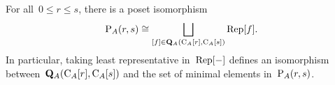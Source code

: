 \begin{prop}\label{prop:morphisms}
For all~$0\leqslant r\leqslant s$, there is a poset isomorphism~$$\mathrm{P}_A(r,s)\cong \bigsqcup_{[f]\in \mathbf{Q}_A(\mathrm{C}_A[r],\mathrm{C}_A[s])}\operatorname{Rep}[f].$$
In particular, taking least representative in~$\operatorname{Rep}[-]$ defines an isomorphism between~$\mathbf{Q}_A(\mathrm{C}_A[r],\mathrm{C}_A[s])$ and the set of minimal elements in~$\mathrm{P}_A(r,s)$. 
%
\end{prop}




